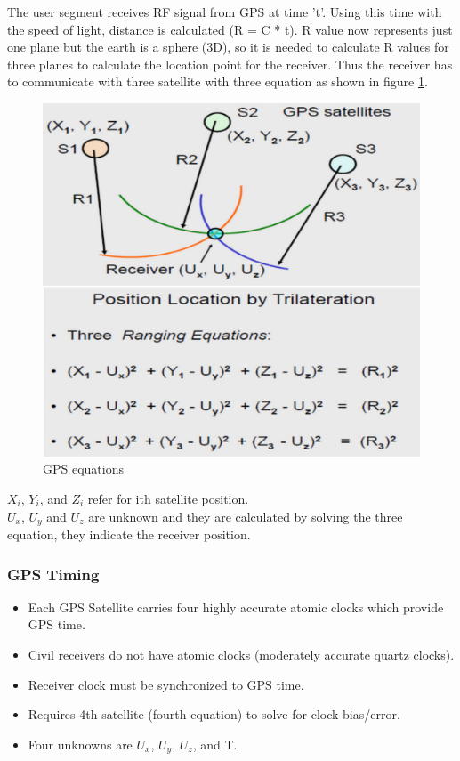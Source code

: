 The user segment receives RF signal from GPS at time 't'. Using this time with the speed of light, distance is calculated (R = C * t).
\newline
R value now represents just one plane but the earth is a sphere (3D), so it is needed to calculate R values for three planes to calculate the location point for the receiver.
\newline Thus the receiver has to communicate with three satellite with three equation as shown in figure \ref{fig:gps-equations}.

    \begin{figure}[h]
    \centering
    \includegraphics[width = .8\textwidth]{figure/5_8.png}
    \caption{GPS equations}
    \label{fig:gps-equations}
    \end{figure}
    
$X_i$, $Y_i$, and $Z_i$ refer for ith satellite position. \\
$U_x$, $U_y$ and $U_z$ are unknown and they are calculated by solving the three equation, they indicate the receiver position.
 
\subsubsection{GPS Timing}

\begin{itemize}
    \item Each GPS Satellite carries four highly accurate atomic clocks which provide GPS time.
    \item Civil receivers do not have atomic clocks (moderately
     accurate quartz clocks).
     \item Receiver clock must be synchronized to GPS time.
     \item  Requires 4th satellite (fourth equation) to solve for clock bias/error.
     \item Four unknowns are $U_x$, $U_y$, $U_z$, and T.
\end{itemize}


